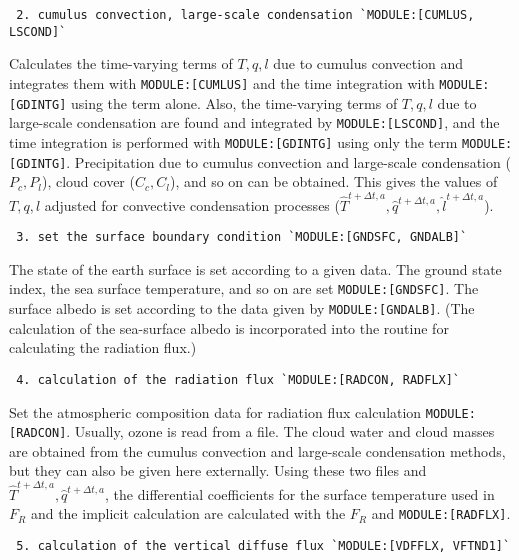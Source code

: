 \begin{verbatim}
 2. cumulus convection, large-scale condensation `MODULE:[CUMLUS, LSCOND]`
\end{verbatim}

Calculates the time-varying terms of \(T, q, l\) due to cumulus
convection and integrates them with \texttt{MODULE:{[}CUMLUS{]}} and the
time integration with \texttt{MODULE:{[}GDINTG{]}} using the term alone.
Also, the time-varying terms of \(T, q, l\) due to large-scale
condensation are found and integrated by \texttt{MODULE:{[}LSCOND{]}},
and the time integration is performed with \texttt{MODULE:{[}GDINTG{]}}
using only the term \texttt{MODULE:{[}GDINTG{]}}. Precipitation due to
cumulus convection and large-scale condensation (\(P_c, P_l\)), cloud
cover (\(C_c, C_l\)), and so on can be obtained. This gives the values
of \(T, q, l\) adjusted for convective condensation processes
(\(\hat{T}^{t+\Delta t,a}, \hat{q}^{t+\Delta t,a}, \hat{l}^{t+\Delta t,a}\)).

\begin{verbatim}
 3. set the surface boundary condition `MODULE:[GNDSFC, GNDALB]`
\end{verbatim}

The state of the earth surface is set according to a given data. The
ground state index, the sea surface temperature, and so on are set
\texttt{MODULE:{[}GNDSFC{]}}. The surface albedo is set according to the
data given by \texttt{MODULE:{[}GNDALB{]}}. (The calculation of the
sea-surface albedo is incorporated into the routine for calculating the
radiation flux.)

\begin{verbatim}
 4. calculation of the radiation flux `MODULE:[RADCON, RADFLX]`
\end{verbatim}

Set the atmospheric composition data for radiation flux calculation
\texttt{MODULE:{[}RADCON{]}}. Usually, ozone is read from a file. The
cloud water and cloud masses are obtained from the cumulus convection
and large-scale condensation methods, but they can also be given here
externally. Using these two files and
\(\hat{T}^{t+\Delta t,a}, \hat{q}^{t+\Delta t,a}\), the differential
coefficients for the surface temperature used in \(F_R\) and the
implicit calculation are calculated with the \(F_R\) and
\texttt{MODULE:{[}RADFLX{]}}.

\begin{verbatim}
 5. calculation of the vertical diffuse flux `MODULE:[VDFFLX, VFTND1]`
\end{verbatim}

